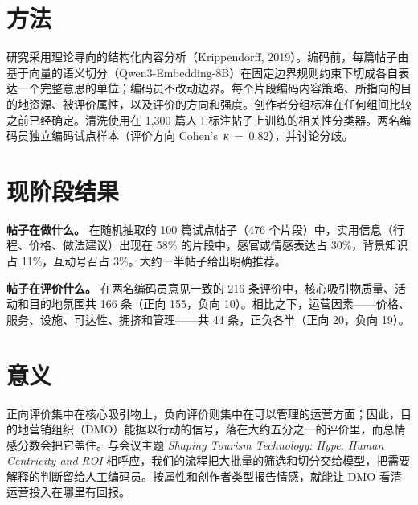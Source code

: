 \documentclass[11pt]{article}
\begin{document}
\section{方法}
研究采用理论导向的结构化内容分析（Krippendorff, 2019）。编码前，每篇帖子由基于向量的语义切分（Qwen3-Embedding-8B）在固定边界规则约束下切成各自表达一个完整意思的单位；编码员不改动边界。每个片段编码内容策略、所指向的目的地资源、被评价属性，以及评价的方向和强度。创作者分组标准在任何组间比较之前已经确定。清洗使用在 1,300 篇人工标注帖子上训练的相关性分类器。两名编码员独立编码试点样本（评价方向 \mbox{{\enit Cohen's \textit{κ} = 0.82}}），并讨论分歧。

\section{现阶段结果}
\noindent\textbf{帖子在做什么。}
在随机抽取的 100 篇试点帖子（476 个片段）中，实用信息（行程、价格、做法建议）出现在 58\% 的片段中，感官或情感表达占 30\%，背景知识占 11\%，互动号召占 3\%。大约一半帖子给出明确推荐。

\vspace{0.7em}
\noindent\textbf{帖子在评价什么。}
在两名编码员意见一致的 216 条评价中，核心吸引物质量、活动和目的地氛围共 166 条（正向 155，负向 10）。相比之下，运营因素——价格、服务、设施、可达性、拥挤和管理——共 44 条，正负各半（正向 20，负向 19）。

\section{意义}
正向评价集中在核心吸引物上，负向评价则集中在可以管理的运营方面；因此，目的地营销组织（DMO）能据以行动的信号，落在大约五分之一的评价里，而总情感分数会把它盖住。与会议主题 {\enit\itshape Shaping Tourism Technology: Hype, Human Centricity and ROI} 相呼应，我们的流程把大批量的筛选和切分交给模型，把需要解释的判断留给人工编码员。按属性和创作者类型报告情感，就能让 DMO 看清运营投入在哪里有回报。
\end{document}
